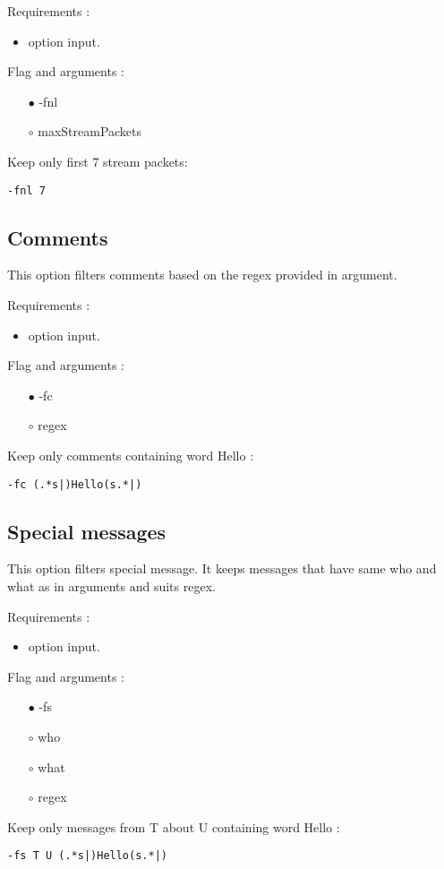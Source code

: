 \documentclass[english]{article}
\begin{document}
\noindent Requirements : 
\begin{itemize}
\item option input. 
\end{itemize}
Flag and arguments :
\begin{itemize}
\item[$\bullet$] -fnl
\item[$\circ$] maxStreamPackets
\end{itemize}
Keep only first 7 stream packets: 
\begin{lstlisting} 
-fnl 7
\end{lstlisting}


\subsection{Comments}
This option filters comments based on the regex provided in argument.

\noindent Requirements : 
\begin{itemize}
\item option input. 
\end{itemize}
Flag and arguments : 

\begin{itemize}
\item[$\bullet$] -fc
\item[$\circ$] regex
\end{itemize}
Keep only comments containing word Hello : 
\begin{lstlisting} 
-fc (.*s|)Hello(s.*|)
\end{lstlisting}


\subsection{Special messages}
This option filters special message. It keeps messages that have same who and what as in arguments and suits regex.  

\noindent Requirements : 
\begin{itemize}
\item option input. 
\end{itemize}
Flag and arguments :
\begin{itemize}
\item[$\bullet$] -fs
\item[$\circ$] who
\item[$\circ$] what
\item[$\circ$] regex
\end{itemize}
Keep only messages from T about U containing word Hello : 
\begin{lstlisting} 
-fs T U (.*s|)Hello(s.*|)
\end{lstlisting}
\end{document}
